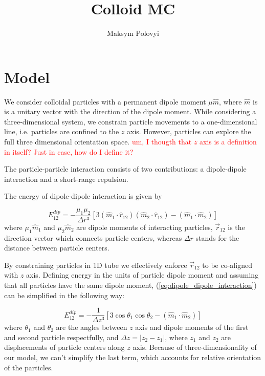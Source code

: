 \documentclass[12pt,a4paper]{article}
\author{Maksym Polovyi}
\title{Colloid MC}
\begin{document}
\section{Model}

We consider colloidal particles with a permanent dipole moment $\mu \hat{m}$, where $\hat{m}$ is is a unitary vector with the direction of the dipole moment. While considering a three-dimensional system, we constrain particle movements to a one-dimensional line, i.e. particles are confined to the $z$ axis. However, particles can explore the full three dimensional orientation space. \textcolor{red}{um, I thougth that $z$ axis is a definition in itself? Just in case, how do I define it?}

The particle-particle interaction consists of two contributions: a dipole-dipole interaction and a short-range repulsion.

The energy of dipole-dipole interaction is given by

\label{eq:dipole_dipole_interaction}
\begin{equation}
E^{dip}_{12} = - \frac{\mu_1 \mu_2}{\Delta r^3}[3 (\hat{m}_1 \cdot \hat{r}_{12})(\hat{m}_2 \cdot \hat{r}_{12}) - (\hat{m}_1 \cdot \hat{m}_2)]
\end{equation}
where $\mu_1 \hat{m}_1$ and $\mu_2 \hat{m}_2$ are dipole moments of interacting particles, $\vec{r}_{12}$ is the direction vector which connects particle centers, whereas $\Delta r$ stands for the distance between particle centers.

By constraining particles in 1D tube we effectively enforce $\vec{r}_{12}$ to be co-aligned with $z$ axis. Defining energy in the units of particle dipole moment and assuming that all particles have the same dipole moment, (\ref{eq:dipole_dipole_interaction}) can be simplified in the following way:

\label{eq_dipole_dipole_1D}
\begin{equation}
E_{12}^{dip} = - \frac{1}{\Delta z^3} [3 \cos \theta_1 \cos \theta_2 - (\hat{m}_1 \cdot \hat{m}_2)]
\end{equation}
where $\theta_1$ and $\theta_2$ are the angles between $z$ axis and dipole moments of the first and second particle respectfully, and $\Delta z = |z_2 - z_1|$, where $z_1$ and $z_2$ are displacements of particle centers along $z$ axis. Because of three-dimensionality of our model, we can't simplify the last term, which accounts for relative orientation of the particles.
\end{document}
